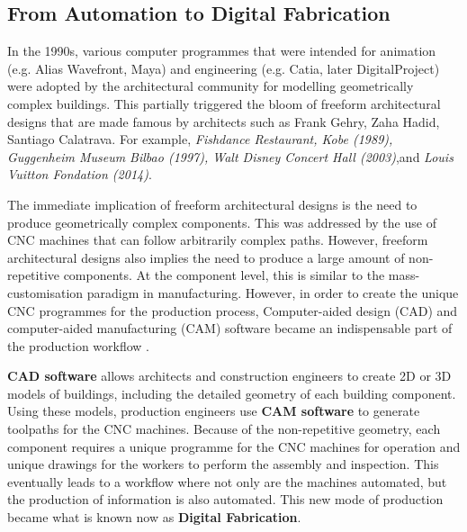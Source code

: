 \subsection{From Automation to Digital Fabrication}
\label{subsection:introduction-from-automation-to-digital-fabrication}

In the 1990s, various computer programmes that were intended for animation (e.g. Alias Wavefront, Maya) and engineering (e.g. Catia, later DigitalProject) were adopted by the architectural community for modelling geometrically complex buildings. This partially triggered the bloom of freeform architectural designs that are made famous by architects such as Frank Gehry, Zaha Hadid, Santiago Calatrava. For example, \textit{Fishdance Restaurant, Kobe (1989),  Guggenheim Museum Bilbao (1997), Walt Disney Concert Hall (2003)},and \textit{ Louis Vuitton Fondation (2014)}.\textit{ }

The immediate implication of freeform architectural designs is the need to produce geometrically complex components. This was addressed by the use of CNC machines that can follow arbitrarily complex paths. However, freeform architectural designs also implies the need to produce a large amount of non-repetitive components. At the component level, this is similar to the mass-customisation paradigm in manufacturing. However, in order to create the unique CNC programmes for the production process, Computer-aided design (CAD) and computer-aided manufacturing (CAM) software became an indispensable part of the production workflow \parencite{sheldenDigitalSurfaceRepresentation2002}. 

\textbf{CAD software} allows architects and construction engineers to create 2D or 3D models of buildings, including the detailed geometry of each building component. Using these models, production engineers use \textbf{CAM software} to generate toolpaths for the CNC machines. Because of the non-repetitive geometry, each component requires a unique programme for the CNC machines for operation and unique drawings for the workers to perform the assembly and inspection. This eventually leads to a workflow where not only are the machines automated, but the production of information is also automated. This new mode of production became what is known now as \textbf{Digital Fabrication}.

